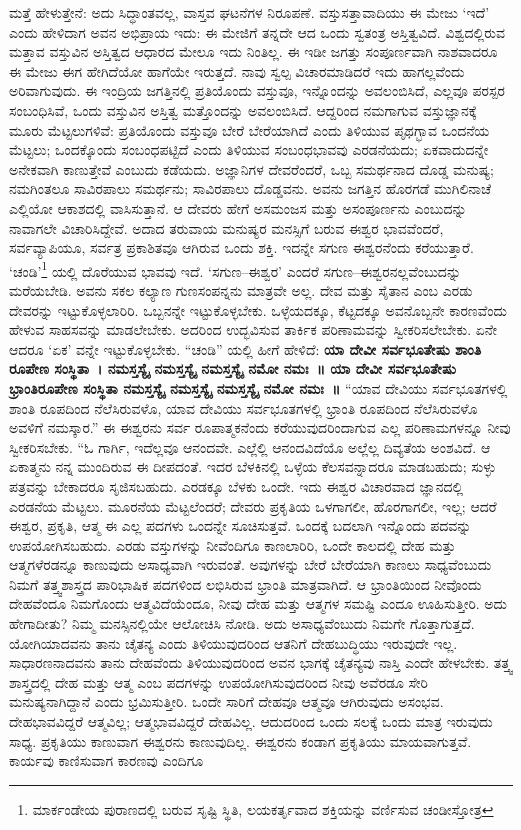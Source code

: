 ಮತ್ತೆ ಹೇಳುತ್ತೇನೆ: ಅದು ಸಿದ್ಧಾಂತವಲ್ಲ, ವಾಸ್ತವ ಘಟನೆಗಳ ನಿರೂಪಣೆ. ವಸ್ತುಸತ್ತಾವಾದಿಯು  ಈ ಮೇಜು ‘ಇದೆ’ ಎಂದು ಹೇಳಿದಾಗ ಅವನ ಅಭಿಪ್ರಾಯ ಇದು: ಈ ಮೇಜಿಗೆ ತನ್ನದೇ ಆದ ಒಂದು ಸ್ವತಂತ್ರ ಅಸ್ತಿತ್ವವಿದೆ. ವಿಶ್ವದಲ್ಲಿರುವ ಮತ್ತಾವ ವಸ್ತುವಿನ ಅಸ್ತಿತ್ವದ ಆಧಾರದ ಮೇಲೂ ಇದು ನಿಂತಿಲ್ಲ. ಈ ಇಡೀ ಜಗತ್ತು ಸಂಪೂರ್ಣವಾಗಿ ನಾಶವಾದರೂ ಈ ಮೇಜು ಈಗ ಹೇಗಿದೆಯೋ ಹಾಗೆಯೇ ಇರುತ್ತದೆ. ನಾವು ಸ್ವಲ್ಪ ವಿಚಾರಮಾಡಿದರೆ ಇದು ಹಾಗಲ್ಲವೆಂದು ಅರಿವಾಗುವುದು. ಈ ಇಂದ್ರಿಯ ಜಗತ್ತಿನಲ್ಲಿ ಪ್ರತಿಯೊಂದು ವಸ್ತುವೂ, ಇನ್ನೊಂದನ್ನು ಅವಲಂಬಿಸಿದೆ, ಎಲ್ಲವೂ ಪರಸ್ಪರ ಸಂಬಂಧಿಸಿವೆ, ಒಂದು ವಸ್ತುವಿನ ಅಸ್ತಿತ್ವ ಮತ್ತೊಂದನ್ನು ಅವಲಂಬಿಸಿದೆ. ಆದ್ದರಿಂದ ನಮಗಾಗುವ ವಸ್ತುಜ್ಞಾನಕ್ಕೆ ಮೂರು ಮೆಟ್ಟಲುಗಳಿವೆ: ಪ್ರತಿಯೊಂದು ವಸ್ತುವೂ ಬೇರೆ ಬೇರೆಯಾಗಿದೆ ಎಂದು ತಿಳಿಯುವ ಪೃಥಗ್ಭಾವ ಒಂದನೆಯ ಮೆಟ್ಟಲು; ಒಂದಕ್ಕೊಂದು ಸಂಬಂಧಪಟ್ಟಿದೆ ಎಂದು ತಿಳಿಯುವ ಸಂಬಂಧಭಾವವು ಎರಡನೆಯದು; ಏಕವಾದುದನ್ನೇ ಅನೇಕವಾಗಿ ಕಾಣುತ್ತೇವೆ ಎಂಬುದು ಕಡೆಯದು. ಅಜ್ಞಾನಿಗಳ ದೇವರೆಂದರೆ, ಒಬ್ಬ ಸಮರ್ಥನಾದ ದೊಡ್ಡ ಮನುಷ್ಯ; ನಮಗಿಂತಲೂ ಸಾವಿರಪಾಲು ಸಮರ್ಥನು; ಸಾವಿರಪಾಲು ದೊಡ್ಡವನು. ಅವನು ಜಗತ್ತಿನ ಹೊರಗಡೆ ಮುಗಿಲಿನಾಚೆ ಎಲ್ಲಿಯೋ ಆಕಾಶದಲ್ಲಿ ವಾಸಿಸುತ್ತಾನೆ. ಆ ದೇವರು ಹೇಗೆ ಅಸಮಂಜಸ ಮತ್ತು ಅಸಂಪೂರ್ಣನು ಎಂಬುದನ್ನು ನಾವಾಗಲೇ ವಿಚಾರಿಸಿದ್ದೇವೆ. ಅದಾದ ತರುವಾಯ ಮನುಷ್ಯರ ಮನಸ್ಸಿಗೆ ಬರುವ ಈಶ್ವರ ಭಾವವೆಂದರೆ, ಸರ್ವವ್ಯಾಪಿಯೂ, ಸರ್ವತ್ರ ಪ್ರಕಾಶಿತವೂ ಆಗಿರುವ ಒಂದು ಶಕ್ತಿ. ಇದನ್ನೇ ಸಗುಣ ಈಶ್ವರನೆಂದು ಕರೆಯುತ್ತಾರೆ. ‘ಚಂಡಿ’\footnote{ಮಾರ್ಕಂಡೇಯ ಪುರಾಣದಲ್ಲಿ ಬರುವ ಸೃಷ್ಟಿ ಸ್ಥಿತಿ, ಲಯಕರ್ತೃವಾದ ಶಕ್ತಿಯನ್ನು ವರ್ಣಿಸುವ ಚಂಡೀಸ್ತೋತ್ರ} ಯಲ್ಲಿ ದೊರೆಯುವ ಭಾವವು ಇದೆ. ‘ಸಗುಣ–ಈಶ್ವರ’ ಎಂದರೆ ಸಗುಣ–ಈಶ್ವರನಲ್ಲವೆಂಬುದನ್ನು ಮರೆಯಬೇಡಿ. ಅವನು ಸಕಲ ಕಲ್ಯಾಣ ಗುಣಸಂಪನ್ನನು ಮಾತ್ರವೇ ಅಲ್ಲ. ದೇವ ಮತ್ತು ಸೈತಾನ ಎಂಬ ಎರಡು ದೇವರನ್ನು ಇಟ್ಟುಕೊಳ್ಳಲಾರಿರಿ. ಒಬ್ಬನನ್ನೇ ಇಟ್ಟುಕೊಳ್ಳಬೇಕು. ಒಳ್ಳೆಯದಕ್ಕೂ, ಕೆಟ್ಟದಕ್ಕೂ ಅವನೊಬ್ಬನೇ ಕಾರಣವೆಂದು ಹೇಳುವ ಸಾಹಸವನ್ನು ಮಾಡಲೇಬೇಕು. ಅದರಿಂದ ಉದ್ಭವಿಸುವ ತಾರ್ಕಿಕ ಪರಿಣಾಮವನ್ನು ಸ್ವೀಕರಿಸಲೇಬೇಕು. ಏನೇ ಆದರೂ ‘ಏಕ’ ವನ್ನೇ ಇಟ್ಟುಕೊಳ್ಳಬೇಕು. “ಚಂಡಿ” ಯಲ್ಲಿ ಹೀಗೆ ಹೇಳಿದೆ: \textbf{ಯಾ ದೇವೀ ಸರ್ವಭೂತೇಷು ಶಾಂತಿ ರೂಪೇಣ ಸಂಸ್ಥಿತಾ~। ನಮಸ್ತಸ್ಯೈ ನಮಸ್ತಸ್ಯೈ ನಮಸ್ತಸ್ಯೈ ನಮೋ ನಮಃ~॥ ಯಾ ದೇವೀ ಸರ್ವಭೂತೇಷು ಭ್ರಾಂತಿರೂಪೇಣ ಸಂಸ್ಥಿತಾ ನಮಸ್ತಸ್ಯೈ ನಮಸ್ತಸ್ಯೈ ನಮಸ್ತಸ್ಯೈ ನಮೋ ನಮಃ~॥} “ಯಾವ ದೇವಿಯು ಸರ್ವಭೂತಗಳಲ್ಲಿ ಶಾಂತಿ ರೂಪದಿಂದ ನೆಲೆಸಿರುವಳೊ, ಯಾವ ದೇವಿಯು ಸರ್ವಭೂತಗಳಲ್ಲಿ ಭ್ರಾಂತಿ ರೂಪದಿಂದ ನೆಲೆಸಿರುವಳೊ ಅವಳಿಗೆ ನಮಸ್ಕಾರ.” ಈ ಈಶ್ವರನು ಸರ್ವ ರೂಪಾತ್ಮಕನೆಂದು ಕರೆಯುವುದರಿಂದಾಗುವ ಎಲ್ಲ ಪರಿಣಾಮಗಳನ್ನೂ ನೀವು ಸ್ವೀಕರಿಸಬೇಕು. “ಓ ಗಾರ್ಗಿ, ಇದೆಲ್ಲವೂ ಆನಂದವೇ. ಎಲ್ಲೆಲ್ಲಿ ಆನಂದವಿದೆಯೊ ಅಲ್ಲೆಲ್ಲ ದಿವ್ಯತೆಯ ಅಂಶವಿದೆ. ಆ ಏಕಾತ್ಮನು ನನ್ನ ಮುಂದಿರುವ ಈ ದೀಪದಂತೆ. ಇದರ ಬೆಳಕಿನಲ್ಲಿ ಒಳ್ಳೆಯ ಕೆಲಸವನ್ನಾದರೂ ಮಾಡಬಹುದು; ಸುಳ್ಳು ಪತ್ರವನ್ನು ಬೇಕಾದರೂ ಸೃಜಿಸಬಹುದು. ಎರಡಕ್ಕೂ ಬೆಳಕು ಒಂದೇ. ಇದು ಈಶ್ವರ ವಿಚಾರವಾದ ಜ್ಞಾನದಲ್ಲಿ ಎರಡನೆಯ ಮೆಟ್ಟಲು. ಮೂರನೆಯ ಮೆಟ್ಟಲೆಂದರೆ; ದೇವರು ಪ್ರಕೃತಿಯ ಒಳಗಾಗಲೀ, ಹೊರಗಾಗಲೀ, ಇಲ್ಲ; ಆದರೆ ಈಶ್ವರ, ಪ್ರಕೃತಿ, ಆತ್ಮ ಈ ಎಲ್ಲ ಪದಗಳು ಒಂದನ್ನೇ ಸೂಚಿಸುತ್ತವೆ. ಒಂದಕ್ಕೆ ಬದಲಾಗಿ ಇನ್ನೊಂದು ಪದವನ್ನು ಉಪಯೋಗಿಸಬಹುದು. ಎರಡು ವಸ್ತುಗಳನ್ನು ನೀವೆಂದಿಗೂ ಕಾಣಲಾರಿರಿ, ಒಂದೇ ಕಾಲದಲ್ಲಿ ದೇಹ ಮತ್ತು ಆತ್ಮಗಳೆರಡನ್ನೂ ಕಾಣುವುದು ಅಸಾಧ್ಯವಾಗಿ ಇರುವಂತೆ. ಅವುಗಳನ್ನು ಬೇರೆ ಬೇರೆಯಾಗಿ ಕಾಣಲು ಸಾಧ್ಯವೆಂಬುದು ನಿಮಗೆ ತತ್ತ್ವಶಾಸ್ತ್ರದ ಪಾರಿಭಾಷಿಕ ಪದಗಳಿಂದ ಲಭಿಸಿರುವ ಭ್ರಾಂತಿ ಮಾತ್ರವಾಗಿದೆ. ಆ ಭ್ರಾಂತಿಯಿಂದ ನೀವೊಂದು ದೇಹವೆಂದೂ ನಿಮಗೊಂದು ಆತ್ಮವಿದೆಯೆಂದೂ, ನೀವು ದೇಹ ಮತ್ತು ಆತ್ಮಗಳ ಸಮಷ್ಟಿ ಎಂದೂ ಊಹಿಸುತ್ತೀರಿ. ಅದು ಹೇಗಾದೀತು? ನಿಮ್ಮ ಮನಸ್ಸಿನಲ್ಲಿಯೇ ಆಲೋಚಿಸಿ ನೋಡಿ. ಅದು ಅಸಾಧ್ಯವೆಂಬುದು ನಿಮಗೇ ಗೊತ್ತಾಗುತ್ತದೆ. ಯೋಗಿಯಾದವನು ತಾನು ಚೈತನ್ಯ ಎಂದು ತಿಳಿಯುವುದರಿಂದ ಆತನಿಗೆ ದೇಹಬುದ್ಧಿಯು ಇರುವುದೇ ಇಲ್ಲ. ಸಾಧಾರಣನಾದವನು ತಾನು ದೇಹವೆಂದು ತಿಳಿಯುವುದರಿಂದ ಅವನ ಭಾಗಕ್ಕೆ ಚೈತನ್ಯವು ನಾಸ್ತಿ ಎಂದೇ ಹೇಳಬೇಕು. ತತ್ತ್ವ ಶಾಸ್ತ್ರದಲ್ಲಿ ದೇಹ ಮತ್ತು ಆತ್ಮ ಎಂಬ ಪದಗಳನ್ನು ಉಪಯೋಗಿಸುವುದರಿಂದ ನೀವು ಅವೆರಡೂ ಸೇರಿ ಮನುಷ್ಯನಾಗಿದ್ದಾನೆ ಎಂದು ಭ್ರಮಿಸುತ್ತೀರಿ. ಒಂದೇ ಸಾರಿಗೆ ದೇಹವೂ ಆತ್ಮವೂ ಆಗಿರುವುದು ಅಸಂಭವ. ದೇಹಭಾವವಿದ್ದರೆ ಆತ್ಮವಿಲ್ಲ; ಆತ್ಮಭಾವವಿದ್ದರೆ ದೇಹವಿಲ್ಲ. ಆದುದರಿಂದ ಒಂದು ಸಲಕ್ಕೆ ಒಂದು ಮಾತ್ರ ಇರುವುದು ಸಾಧ್ಯ. ಪ್ರಕೃತಿಯು ಕಾಣುವಾಗ ಈಶ್ವರನು ಕಾಣುವುದಿಲ್ಲ. ಈಶ್ವರನು ಕಂಡಾಗ ಪ್ರಕೃತಿಯು ಮಾಯವಾಗುತ್ತವೆ. ಕಾರ್ಯವು ಕಾಣಿಸುವಾಗ ಕಾರಣವು ಎಂದಿಗೂ 